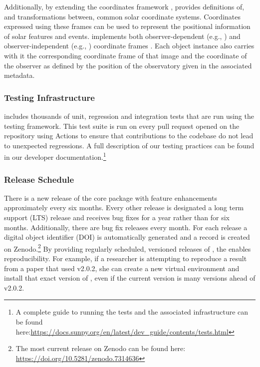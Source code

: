 Additionally, by extending the \astropypkg coordinates framework \citep[see Section 3.3 of][for more details]{the_astropy_collaboration_astropy_2018}, \sunpypkg provides definitions of, and transformations between, common solar coordinate systems.
Coordinates expressed using these frames can be used to represent the positional information of solar features and events. \sunpypkg implements both observer-dependent (e.g., \hpc) and observer-independent (e.g., \hgs) coordinate frames \citep{thompson_coordinate_2006}.
Each  object instance also carries with it the corresponding coordinate frame of that image and the coordinate of the observer as defined by the position of the observatory given in the associated metadata.

\subsubsection{Testing Infrastructure}
\label{sssec:testing-infrastructure}

\sunpypkg includes thousands of unit, regression and integration tests that are run using the  testing framework.
This test suite is run on every pull request opened on the \sunpypkg \github repository using \github Actions to ensure that contributions to the codebase do not lead to unexpected regressions.
A full description of our testing practices can be found in our developer documentation.\footnote{A complete guide to running the tests and the associated infrastructure can be found here:\url{https://docs.sunpy.org/en/latest/dev_guide/contents/tests.html}}

\subsubsection{Release Schedule}
\label{sssec:release-schedule}

There is a new release of the core package with feature enhancements approximately every six months.
Every other release is designated a long term support (LTS) release and receives bug fixes for a year rather than for six months.
Additionally, there are bug fix releases every month.
For each release a digital object identifier (DOI) is automatically generated and a record is created on Zenodo.\footnote{The most current release on Zenodo can be found here: \url{https://doi.org/10.5281/zenodo.7314636}}
By providing regularly scheduled, versioned releases of \sunpypkg, the \sunpyproj enables reproducibility.
For example, if a researcher is attempting to reproduce a result from a paper that used \sunpypkg v2.0.2, she can create a new virtual environment and install that exact version of \sunpypkg, even if the current version is many versions ahead of v2.0.2.

